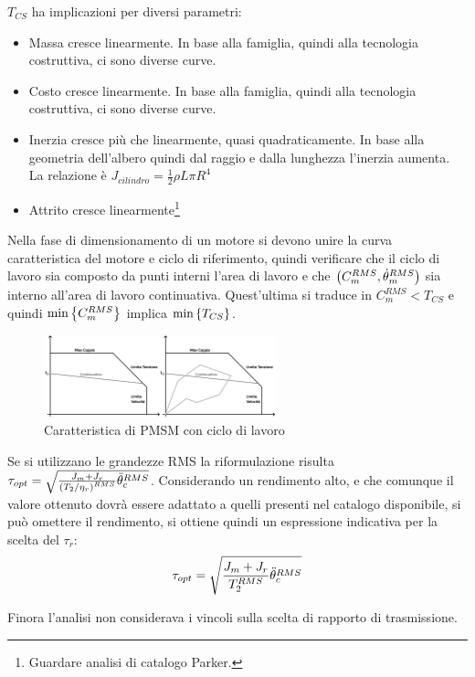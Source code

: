 \(T_{CS}\) ha implicazioni per diversi parametri:
\begin{itemize}
    \item Massa cresce linearmente. In base alla famiglia, quindi alla tecnologia costruttiva, ci sono diverse curve.
    \item Costo cresce linearmente. In base alla famiglia, quindi alla tecnologia costruttiva, ci sono diverse curve.
    \item Inerzia cresce più che linearmente, quasi quadraticamente. In base alla geometria dell'albero quindi dal raggio e dalla lunghezza l'inerzia aumenta. La relazione è \(J_{cilindro} = \frac{1}{2} \rho L \pi R^4\)
    \item Attrito cresce linearmente\footnote{Guardare analisi di catalogo Parker.}
\end{itemize}

Nella fase di dimensionamento di un motore si devono unire la curva caratteristica del motore  e ciclo di riferimento, quindi verificare che il ciclo di lavoro sia composto da punti interni l'area di lavoro e che \(\left(C_m^{RMS},\dot{\theta}_m^{RMS} \right)\) sia interno all'area di lavoro continuativa.
Quest'ultima si traduce in \(C_m^{RMS} < T_{CS}\) e quindi \(\operatorname{min}\left\{ C_m^{RMS} \right\}\) implica \(\operatorname{min}\left\{ T_{CS} \right\}\).

\begin{figure}[h]
    \centering
    \includegraphics[width=0.6\textwidth]{Immagini/CaratteristicaPMSM.png}
    \caption{Caratteristica di PMSM con ciclo di lavoro}
\end{figure}

Se si utilizzano le grandezze RMS la riformulazione risulta \(\tau_{opt} = \sqrt{\frac{J_m + J_r}{\left(T_2/\eta_r\right)^{RMS}}\Ddot{\theta}_c^{RMS}}\). Considerando un rendimento alto, e che comunque il valore ottenuto dovrà essere adattato a quelli presenti nel catalogo disponibile, si può omettere il rendimento, si ottiene quindi un espressione indicativa per la scelta del \(\tau_r\):
\[\tau_{opt} = \sqrt{\frac{J_m + J_r}{T_2^{RMS}}\Ddot{\theta}_c^{RMS}}\] 

Finora l'analisi non considerava i vincoli sulla scelta di rapporto di trasmissione.

